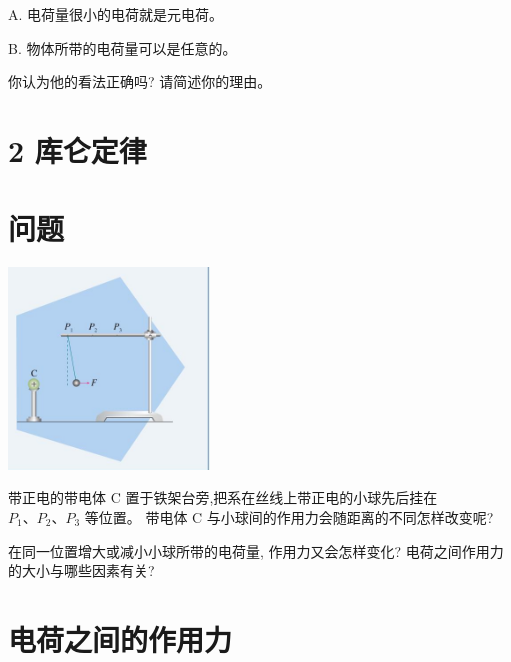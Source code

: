 \documentclass[10pt]{article}
\begin{document}
A. 电荷量很小的电荷就是元电荷。

B. 物体所带的电荷量可以是任意的。

你认为他的看法正确吗? 请简述你的理由。

\section*{2 库仑定律}

\section*{问题}

\begin{center}
\includegraphics[max width=0.4\textwidth]{images/01911d5f-8e38-70c0-b5b8-2b399bd115b6_11_133391.jpg}
\end{center}

带正电的带电体 \(\mathrm{C}\) 置于铁架台旁,把系在丝线上带正电的小球先后挂在 \({P}_{1}\text{、}{P}_{2}\text{、}{P}_{3}\) 等位置。 带电体 \(\mathrm{C}\) 与小球间的作用力会随距离的不同怎样改变呢?

在同一位置增大或减小小球所带的电荷量, 作用力又会怎样变化? 电荷之间作用力的大小与哪些因素有关?

\section*{电荷之间的作用力}
\end{document}
